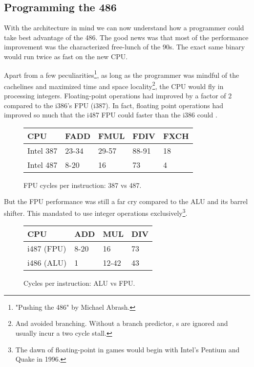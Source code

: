 \subsection{Programming the 486}
With the architecture in mind we can now understand how a programmer could take best advantage of the 486. The good news was that most of the performance improvement was the characterized free-lunch of the 90s. The exact same binary would run twice as fast on the new CPU.\\
\par
Apart from a few peculiarities\footnote{"Pushing the 486" by Michael Abrash.}, as long as the programmer was mindful of the cachelines and maximized time and space locality\footnote{And avoided branching. Without a branch predictor, s are ignored and usually incur a two cycle stall.}, the CPU would fly in processing integers. Floating-point operations had improved by a factor of 2 compared to the i386's FPU (i387). In fact, floating point operations had improved so much that the i487 FPU could  faster than the i386 could .\\
\par
\begin{figure}[H]
\centering
\begin{tabularx}{\textwidth}{ X  X X  X  X}
  \toprule
  \textbf{CPU} & \textbf{FADD} & \textbf{FMUL} & \textbf{FDIV} &\textbf{FXCH} \\
  \toprule
Intel 387 & 23-34 & 29-57   & 88-91 & 18 \\
Intel 487 & 8-20  & 16   & 73 & 4 \\ \bottomrule
\end{tabularx}
\caption{FPU cycles per instruction: 387 vs 487.}

\end{figure}

\par
But the FPU performance was still a far cry compared to the ALU and its barrel shifter. This mandated \doom{} to use integer operations exclusively\footnote{The dawn of floating-point in games would begin with Intel's Pentium and Quake in 1996.}.\\

\par
 \begin{figure}[H]
\centering  
\begin{tabularx}{\textwidth}{ L{0.25} L{0.25} L{0.25} L{0.25} }
  \toprule
  \textbf{CPU} &  \textbf{ADD}  & \textbf{MUL} & \textbf{DIV}\\
  \toprule 
   i487 (FPU) & 8-20  & 16 & 73\\
   i486 (ALU) & 1  & 12-42 & 43\\
   \toprule
\end{tabularx}
\caption{Cycles per instruction: ALU vs FPU.}
\end{figure}

